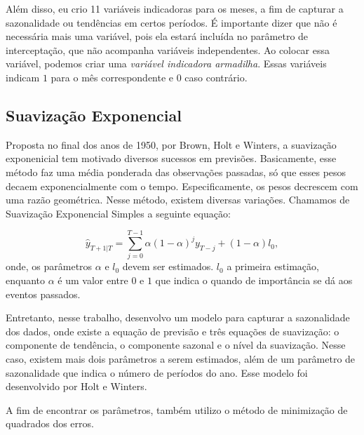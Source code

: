 Além disso, eu crio 11 variáveis indicadoras para os meses, a fim de capturar
a sazonalidade ou tendências em certos períodos. É importante dizer que não é 
necessária mais uma variável, pois ela estará incluída no parâmetro de
interceptação, que não acompanha variáveis independentes. Ao colocar essa
variável, podemos criar uma \textit{variável indicadora armadilha}. Essas
variáveis indicam $1$ para o mês correspondente e $0$ caso contrário. 

\subsection{Suavização Exponencial}

Proposta no final dos anos de 1950, por Brown, Holt e Winters, a suavização
exponenicial tem motivado diversos sucessos em previsões. Basicamente, esse
método faz uma média ponderada das observações passadas, só que esses pesos
decaem exponencialmente com o tempo. Especificamente, os pesos decrescem com
uma razão geométrica. Nesse método, existem diversas variações. Chamamos de
Suavização Exponencial Simples a seguinte equação:

$$\hat{y}_{T+1|T} = \sum_{j=0}^{T-1} \alpha(1 - \alpha)^jy_{T-j} + (1-
\alpha)l_0,$$
onde, os parâmetros $\alpha$ e $l_0$ devem ser estimados. $l_0$ a primeira
estimação, enquanto $\alpha$ é um valor entre $0$ e $1$ que indica o quando de
importância se dá aos eventos passados. 

Entretanto, nesse trabalho, desenvolvo um modelo para capturar a sazonalidade
dos dados, onde existe a equação de previsão e três equações de suavização: o
componente de tendência, o componente sazonal e o nível da suavização. Nesse
caso, existem mais dois parâmetros a serem estimados, além de um parâmetro de
sazonalidade que indica o número de períodos do ano. Esse modelo foi
desenvolvido por Holt e Winters. 

A fim de encontrar os parâmetros, também utilizo o método de minimização de
quadrados dos erros. 